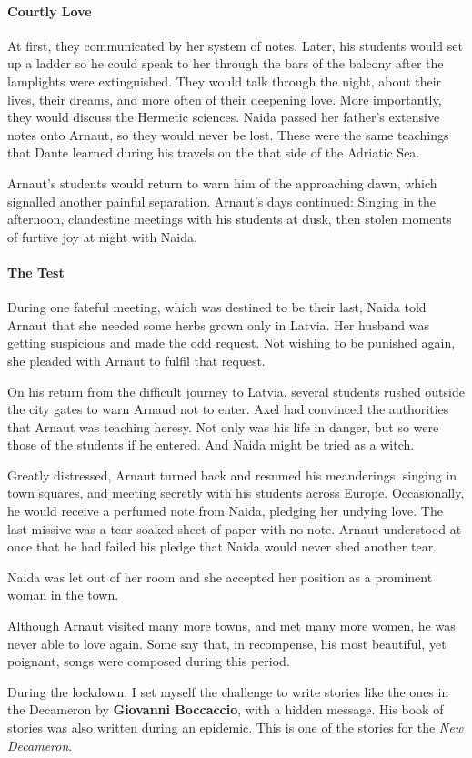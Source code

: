 \paragraph{Courtly Love}


At first, they communicated by her system of notes. Later, his students would set up a ladder so he could speak to her through the bars of the balcony after the lamplights were extinguished. They would talk through the night, about their lives, their dreams, and more often of their deepening love. More importantly, they would discuss the Hermetic sciences. Naida passed her father's extensive notes onto Arnaut, so they would never be lost. These were the same teachings that Dante learned during his travels on the that side of the Adriatic Sea.

Arnaut's students would return to warn him of the approaching dawn, which signalled another painful separation. Arnaut's days continued: Singing in the afternoon, clandestine meetings with his students at dusk, then stolen moments of furtive joy at night with Naida.

\paragraph{The Test}


During one fateful meeting, which was destined to be their last, Naida told Arnaut that she needed some herbs grown only in Latvia. Her husband was getting suspicious and made the odd request. Not wishing to be punished again, she pleaded with Arnaut to fulfil that request.

On his return from the difficult journey to Latvia, several students rushed outside the city gates to warn Arnaud not to enter. Axel had convinced the authorities that Arnaut was teaching heresy. Not only was his life in danger, but so were those of the students if he entered. And Naida might be tried as a witch.

Greatly distressed, Arnaut turned back and resumed his meanderings, singing in town squares, and meeting secretly with his students across Europe. Occasionally, he would receive a perfumed note from Naida, pledging her undying love. The last missive was a tear soaked sheet of paper with no note. Arnaut understood at once that he had failed his pledge that Naida would never shed another tear.

Naida was let out of her room and she accepted her position as a prominent woman in the town.

Although Arnaut visited many more towns, and met many more women, he was never able to love again. Some say that, in recompense, his most beautiful, yet poignant, songs were composed during this period.

\begin{quotex}
During the lockdown, I set myself the challenge to write stories like the ones in the Decameron by \textbf{Giovanni Boccaccio}, with a hidden message. His book of stories was also written during an epidemic. This is one of the stories for the \emph{New Decameron}.
\end{quotex}




